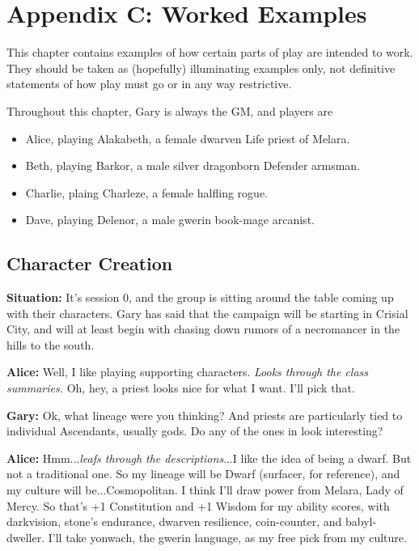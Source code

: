 \chapter{Appendix C: Worked Examples}\label{ch:examples}
This chapter contains examples of how certain parts of play are intended to work. They should be taken as (hopefully) illuminating examples only, not definitive statements of how play must go or in any way restrictive.

Throughout this chapter, Gary is always the GM, and players are
\begin{itemize}
	\item Alice, playing Alakabeth, a female dwarven Life priest of Melara.
	\item Beth, playing Barkor, a male silver dragonborn Defender armsman.
	\item Charlie, plaing Charleze, a female halfling rogue.
	\item Dave, playing Delenor, a male gwerin book-mage arcanist.
\end{itemize}

\section{Character Creation}\label{examples:character-creation}
\textbf{Situation:} It's session 0, and the group is sitting around the table coming up with their characters. Gary has said that the campaign will be starting in Crisial City, and will at least begin with chasing down rumors of a necromancer in the hills to the south.

\textbf{Alice:} Well, I like playing supporting characters. \textit{Looks through the class summaries.} Oh, hey, a priest looks nice for what I want. I'll pick that.

\textbf{Gary:} Ok, what lineage were you thinking? And priests are particularly tied to individual Ascendants, usually gods. Do any of the ones in  look interesting?

\textbf{Alice:} Hmm...\textit{leafs through the descriptions}...I like the idea of being a dwarf. But not a traditional one. So my lineage will be Dwarf (surfacer, for reference), and my culture will be...Cosmopolitan. I think I'll draw power from Melara, Lady of Mercy. So that's +1 Constitution and +1 Wisdom for my ability scores, with darkvision, stone's endurance, dwarven resilience, coin-counter, and babyl-dweller. I'll take yonwach, the gwerin language, as my free pick from my culture.

